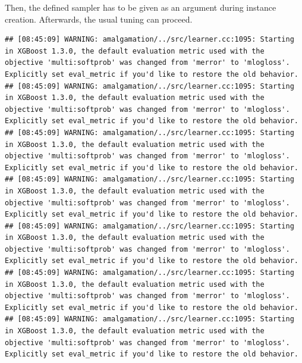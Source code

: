 \documentclass[
]{scrbook}
\newenvironment{Shaded}{\begin{snugshade}}{\end{snugshade}}
\newcommand{\AttributeTok}[1]{\textcolor[rgb]{0.77,0.63,0.00}{#1}}
\newcommand{\DecValTok}[1]{\textcolor[rgb]{0.00,0.00,0.81}{#1}}
\newcommand{\FunctionTok}[1]{\textcolor[rgb]{0.00,0.00,0.00}{#1}}
\newcommand{\NormalTok}[1]{#1}
\newcommand{\OtherTok}[1]{\textcolor[rgb]{0.56,0.35,0.01}{#1}}
\newcommand{\SpecialCharTok}[1]{\textcolor[rgb]{0.00,0.00,0.00}{#1}}
\newcommand{\StringTok}[1]{\textcolor[rgb]{0.31,0.60,0.02}{#1}}
\renewenvironment{Shaded} {\begin{snugshade}\small} {\end{snugshade}}
\begin{document}
Then, the defined sampler has to be given as an argument during instance creation.
Afterwards, the usual tuning can proceed.

\begin{Shaded}
\end{Shaded}

\begin{verbatim}
## [08:45:09] WARNING: amalgamation/../src/learner.cc:1095: Starting in XGBoost 1.3.0, the default evaluation metric used with the objective 'multi:softprob' was changed from 'merror' to 'mlogloss'. Explicitly set eval_metric if you'd like to restore the old behavior.
## [08:45:09] WARNING: amalgamation/../src/learner.cc:1095: Starting in XGBoost 1.3.0, the default evaluation metric used with the objective 'multi:softprob' was changed from 'merror' to 'mlogloss'. Explicitly set eval_metric if you'd like to restore the old behavior.
## [08:45:09] WARNING: amalgamation/../src/learner.cc:1095: Starting in XGBoost 1.3.0, the default evaluation metric used with the objective 'multi:softprob' was changed from 'merror' to 'mlogloss'. Explicitly set eval_metric if you'd like to restore the old behavior.
## [08:45:09] WARNING: amalgamation/../src/learner.cc:1095: Starting in XGBoost 1.3.0, the default evaluation metric used with the objective 'multi:softprob' was changed from 'merror' to 'mlogloss'. Explicitly set eval_metric if you'd like to restore the old behavior.
## [08:45:09] WARNING: amalgamation/../src/learner.cc:1095: Starting in XGBoost 1.3.0, the default evaluation metric used with the objective 'multi:softprob' was changed from 'merror' to 'mlogloss'. Explicitly set eval_metric if you'd like to restore the old behavior.
## [08:45:09] WARNING: amalgamation/../src/learner.cc:1095: Starting in XGBoost 1.3.0, the default evaluation metric used with the objective 'multi:softprob' was changed from 'merror' to 'mlogloss'. Explicitly set eval_metric if you'd like to restore the old behavior.
## [08:45:09] WARNING: amalgamation/../src/learner.cc:1095: Starting in XGBoost 1.3.0, the default evaluation metric used with the objective 'multi:softprob' was changed from 'merror' to 'mlogloss'. Explicitly set eval_metric if you'd like to restore the old behavior.

\end{verbatim}
\end{document}
